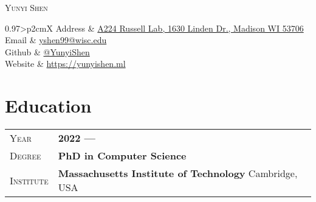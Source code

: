 \documentclass[letterpaper, oneside, final]{scrartcl} %
\begin{document}
	
\begin{center} %


{\fontsize{36}{36}\selectfont\scshape Yunyi Shen} %

\vspace{1.5cm} %
\hspace{-2cm}


\begin{tabularx}{0.97\linewidth}{>{\raggedleft\scshape}p{2cm}X}
	Address & \href{https://www.google.com/maps/place/Russell+Laboratories,+1630+Linden+Dr,+Madison,+WI+53706/@43.0755343,-89.4157108,17z/data=!3m1!4b1!4m5!3m4!1s0x8807acc0bc8b45b9:0x855709798126d445!8m2!3d43.0755304!4d-89.4135221}{A224 Russell Lab, 1630 Linden Dr., Madison WI 53706} \\
	Email & \href{mailto://yshen99@wisc.edu}{yshen99@wisc.edu}\\
	Github & \href{https://github.com/YunyiShen}{@YunyiShen}\\
	Website & \href{https://yunyishen.ml}{https://yunyishen.ml}
\end{tabularx}



\section{Education}

\begin{tabularx}{0.97\linewidth}{>{\raggedleft\scshape}p{2cm}X}
	Year & \textbf{2022 --- }\\
	Degree & \textbf{PhD in Computer Science}\\
	Institute & \textbf{Massachusetts Institute of Technology} \hfill Cambridge, USA\\
\end{tabularx}


\end{center}
\end{document}
